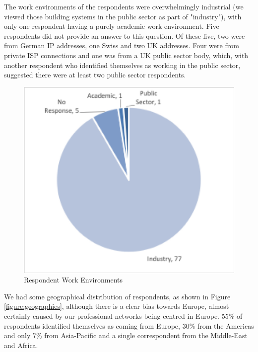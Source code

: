 The work environments of the respondents were overwhelmingly industrial (we viewed those building systems in the public sector as part of "industry"), with only one respondent having a purely academic work environment.  Five respondents did not provide an answer to this question.  Of these five, two were from German IP addresses, one Swiss and two UK addresses.  Four were from private ISP connections and one was from a UK public sector body, which, with another respondent who identified themselves as working in the public sector, suggested there were at least two public sector respondents.
 
\begin{figure}
\centering
\includegraphics[width=12cm]{Figures/prioritisation-workenv}
\caption{Respondent Work Environments}
\label{figure:workenvs}
\end{figure}

We had some geographical distribution of respondents, as shown in Figure \ref{figure:geographies}, although there is a clear bias towards Europe, almost certainly caused by our professional networks being centred in Europe.  55\% of respondents identified themselves as coming from Europe, 30\% from the Americas and only 7\% from Asia-Pacific and a single correspondent from the Middle-East and Africa.

